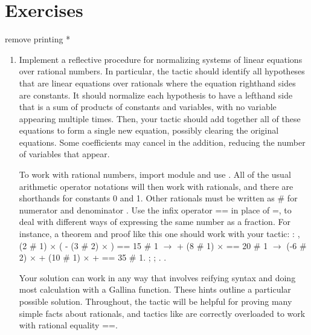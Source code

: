\documentclass[12pt]{report}
\begin{document}
\section{Exercises}



 remove printing * 

 \begin{enumerate}


\item Implement a reflective procedure for normalizing systems of linear equations over rational numbers.  In particular, the tactic should identify all hypotheses that are linear equations over rationals where the equation righthand sides are constants.  It should normalize each hypothesis to have a lefthand side that is a sum of products of constants and variables, with no variable appearing multiple times.  Then, your tactic should add together all of these equations to form a single new equation, possibly clearing the original equations.  Some coefficients may cancel in the addition, reducing the number of variables that appear.


To work with rational numbers, import module  and use    .  All of the usual arithmetic operator notations will then work with rationals, and there are shorthands for constants 0 and 1.  Other rationals must be written as  \#  for numerator  and denominator .  Use the infix operator == in place of =, to deal with different ways of expressing the same number as a fraction.  For instance, a theorem and proof like this one should work with your tactic:
\coqdoceol
\coqdocemptyline
\coqdocindent{1.00em}
  : \coqdockw{\ensuremath{\forall}}   , (2 \# 1) \ensuremath{\times} ( - (3 \# 2) \ensuremath{\times} ) == 15 \# 1\coqdoceol
\coqdocindent{2.00em}
\ensuremath{\rightarrow}  + (8 \# 1) \ensuremath{\times}  == 20 \# 1\coqdoceol
\coqdocindent{2.00em}
\ensuremath{\rightarrow} (-6 \# 2) \ensuremath{\times}  + (10 \# 1) \ensuremath{\times}  +  == 35 \# 1.\coqdoceol
\coqdocindent{2.00em}
; ; .\coqdoceol
\coqdocindent{1.00em}
.

\coqdocemptyline


  Your solution can work in any way that involves reifying syntax and doing most calculation with a Gallina function.  These hints outline a particular possible solution.  Throughout, the  tactic will be helpful for proving many simple facts about rationals, and tactics like  are correctly overloaded to work with rational equality ==.



\end{enumerate}
\end{document}
